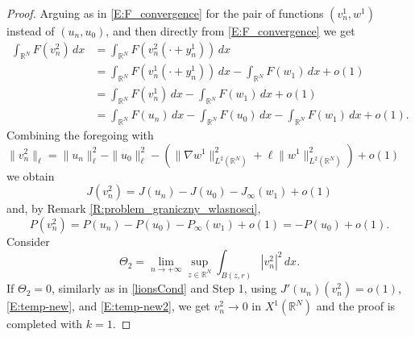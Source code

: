 \documentclass[12pt,leqno,twoside,sort]{amsart}
\newcommand{\R}{\mathbb{R}}
\numberwithin{equation}{section}
\begin{document}
\begin{proof}
Arguing as in \eqref{E:F_convergence} for the pair of functions $(v_n^1, w^1)$ instead of $(u_n, u_0)$, and then directly from \eqref{E:F_convergence} we get
\begin{equation}\label{E:nonlinearity_decomposition}
\begin{split}
\int_{\R^N} F(v_n^2) \, dx 
&=\int_{\R^N} F(v_n^2(\cdot + y_n^1)) \, dx \\
&=\int_{\R^N} F(v_n^1(\cdot+y_n^1))\,dx -\int_{\R^N} F(w_1)\,dx +o(1)\\
&=\int_{\R^N} F(v_n^1)\,dx -\int_{\R^N} F(w_1)\,dx +o(1)\\
&=\int_{\R^N} F(u_n)\,dx -\int_{\R^N} F(u_0)\,dx - \int_{\R^N} F(w_1)\,dx +o(1).
\end{split}
\end{equation}
Combining the foregoing with $\|v_n^2\|_\ell=\|u_n\|_\ell^2 - \|u_0\|_\ell^2 - \left( \|\nabla w^1\|_{L^2 (\R^N)}^2 + \ell \| w^1 \|_{L^2 (\R^N)}^2 \right) +o(1)$ we obtain
\[
J(v_n^2)=J(u_n)-J(u_0)-J_\infty(w_1)+o(1)
\]
and, by Remark \ref{R:problem_graniczny_wlasnosci},
\[
P(v_n^2)=P(u_n)-P(u_0)-P_\infty(w_1)+o(1)=-P(u_0)+o(1).
\]
Consider 
\[
\Theta_2=\lim_{n \to +\infty} \sup_{z \in \R^N} \int_{B(z, r)} |v_n^2|^2 \, dx.
\]
If $\Theta_2=0$, similarly as in \eqref{lionsCond} and Step 1, using $J'(u_n)(v_n^2)=o(1)$, \eqref{E:temp-new}, and \eqref{E:temp-new2}, we get $v_n^2\to 0$ in $X^1(\R^N)$ and the proof is completed with $k=1$.


\end{proof}
\end{document}
